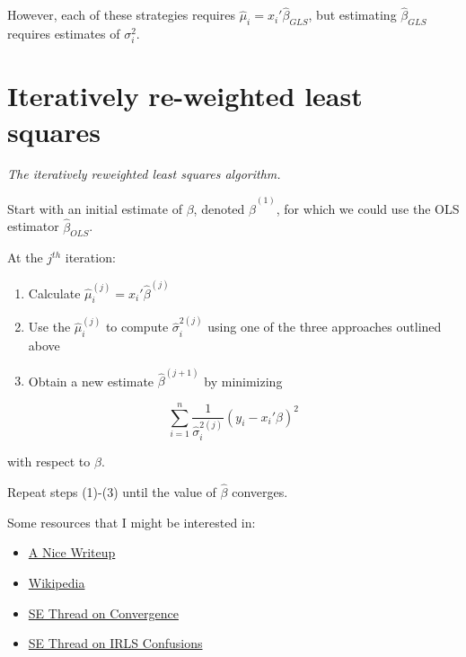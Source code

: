 \documentclass[
  letterpaper,
  DIV=11,
  numbers=noendperiod]{scrreport}
\providecommand{\tightlist}{%
  \setlength{\itemsep}{0pt}\setlength{\parskip}{0pt}}\usepackage{longtable,booktabs,array}
\begin{document}
However, each of these strategies requires
\(\hat \mu_i = x_i' \hat \beta_{GLS}\), but estimating
\(\hat \beta_{GLS}\) requires estimates of \(\sigma_i^2\).

\hypertarget{iteratively-re-weighted-least-squares}{%
\section{Iteratively re-weighted least
squares}\label{iteratively-re-weighted-least-squares}}

\emph{The iteratively reweighted least squares algorithm.}

Start with an initial estimate of \(\beta\), denoted
\(\hat \beta^{(1)}\), for which we could use the OLS estimator
\(\hat \beta_{OLS}\).

At the \(j^{th}\) iteration:

\begin{enumerate}
\def\labelenumi{\arabic{enumi}.}
\tightlist
\item
  Calculate \(\hat \mu_i^{(j)} = x_i' \hat \beta^{(j)}\)
\item
  Use the \(\hat \mu_i^{(j)}\) to compute \(\hat \sigma_i^{2(j)}\) using
  one of the three approaches outlined above
\item
  Obtain a new estimate \(\hat \beta^{(j+1)}\) by minimizing
\end{enumerate}

\[
  \sum_{i=1}^n \frac{1}{\hat \sigma_i^{2(j)}} (y_i - x_i' \beta)^2
  \]

with respect to \(\beta\).

Repeat steps (1)-(3) until the value of \(\hat \beta\) converges.

Some resources that I might be interested in:

\begin{itemize}
\tightlist
\item
  \href{https://anilkeshwani.github.io/files/iterative-reweighted-least-squares-12.pdf}{A
  Nice Writeup}
\item
  \href{https://en.wikipedia.org/wiki/Iteratively_reweighted_least_squares}{Wikipedia}
\item
  \href{https://stats.stackexchange.com/questions/36250/definition-and-convergence-of-iteratively-reweighted-least-squares}{SE
  Thread on Convergence}
\item
  \href{https://stats.stackexchange.com/questions/521065/iteratively-reweighted-least-squares-weights-confusion}{SE
  Thread on IRLS Confusions}
\end{itemize}
\end{document}
